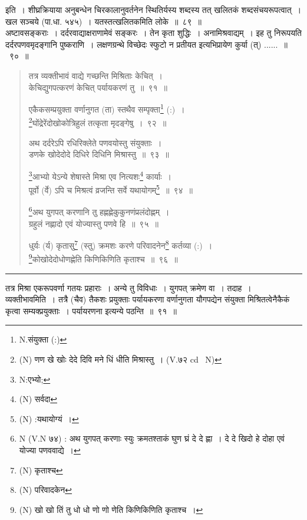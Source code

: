 \documentclass[11pt, openany]{book}
\begin{document}
\noindent
इति~। शीघ्रक्रियाया अनुबन्धेन चिरकालानुवर्तनेन स्थितिर्यस्य शब्दस्य तत् खलितकं शब्दसंचयरूपत्वात्~। खल सञ्चये (पा.धा. ५४५)~। यतस्तत्खलितकमिति लोके~॥~८९~॥\\

{\qtt अष्टावसङ्कराः}~। दर्दरवाद्याक्षराणामेवं सङ्करः~। तेन कृता शुद्धिः~। {\qtt अनामिश्रवाद्यम्}~। इह तु निरूपयति दर्दरपणवमृदङ्गानि पुष्कराणि~। लक्षणग्रन्थे विच्छेदः स्फुटो न प्रतीयत इत्यभिप्रायेण कुर्या (त्) ......~॥~९०~॥

\newpage

\begin{quote}
{\na तत्र व्यक्तीभावं वाद्ये गच्छन्ति मिश्रिताः केचित्~।\\
केचिद्युगपत्करणं केचित् पर्यायकरणं तु~॥~९१~॥

एकैकसम्प्रयुक्ता वर्णानुगत (ता) स्तथैव सम्पृक्ता\renewcommand{\thefootnote}{1}\footnote{N.संयुक्ता (:)} (:)~।\\
\renewcommand{\thefootnote}{2}\footnote{(N) णण खे खोः देदे दिवि मने धिं धीति मिश्रास्तु~। (V.७२ cd \textendash\ N)}घोंद्रेरेंदोखोकोत्रिहुलं तत्कृता मृदङ्गेषु~।~९२~॥

अथ दर्दरेऽपि रधिरिक्लेते पणवयोस्तु संयुक्ताः~।\\
डणके खोदेदोदे दिधिरे दिधिनि मिश्रास्तु~॥~९३~॥

\renewcommand{\thefootnote}{3}\footnote{N:एभ्यो;}आभ्यो येऽन्ये शेषास्ते मिश्रा एव नित्यशः\renewcommand{\thefootnote}{4}\footnote{(N) सर्वदा} कार्याः~।\\
पूर्वो (र्वे) ऽपि च मिश्रत्वं व्रजन्ति सर्वे यथायोगम्\renewcommand{\thefootnote}{5}\footnote{(N) :यथायोग्यं~।}~॥~९४~॥

\renewcommand{\thefootnote}{6}\footnote{N (V.N ७४) : अथ युगपत् करणाः स्युः क्रमतश्ताकं घुण घ्रं दे दे ह्णा~। दे दे खिदो हे दोहा एवं योज्या पणववाद्ये~।}अथ युगपत् करणानि तु हह्णह्णेकुकुनणंप्रलंदोह्णम्~।\\
ग्रहुलं नह्णादो एवं योज्यास्तु पणवे हि~॥~९५~॥

धुर्यः (र्य) कृतासु\renewcommand{\thefootnote}{7}\footnote{(N) कृताश्च} (स्तु) क्रमशः करणे परिवादनेन\renewcommand{\thefootnote}{8}\footnote{(N) परिवादकेन} कर्तव्या (:)~।\\
\renewcommand{\thefootnote}{9}\footnote{(N) खो खो तिं तु धो धो णो णो णेति किणिकिणिति कृताश्च~।}कोखोदेदोधोणह्णेति किणिकिणिति कृताश्च~॥~९६~॥}
\end{quote}

\hrule
 
\vspace{2mm}
तत्र मिश्रा एकरूपवर्णा गतयः प्रहाराः~। अन्ये तु विविधाः~। युगपत् क्रमेण वा~। तदाह~। {\qtt व्यक्तीभावमिति}~। तत्रै (चैव) तैकशः प्रयुक्ताः पर्यायकरणा वर्णानुगता यौगपद्येन संयुक्ता मिश्रितत्वेनैकैकं कृत्वा सम्यक्प्रयुक्ताः~। पर्यायरणना इत्यन्ये पठन्ति~॥~९१~॥\\
\end{document}
